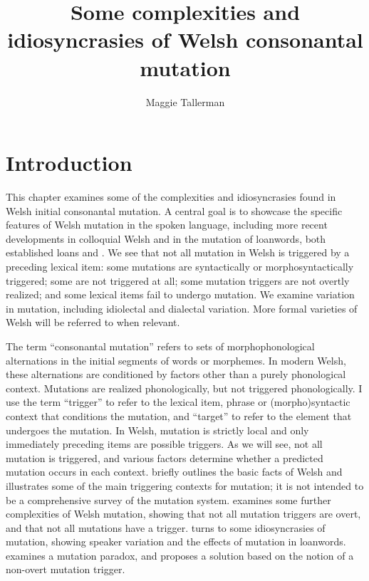 \documentclass[output=paper,colorlinks,citecolor=brown]{langscibook}
\author{Maggie Tallerman\orcid{}\affiliation{Newcastle University}}
\title{Some complexities and idiosyncrasies of Welsh consonantal mutation}
\begin{document}
\maketitle




\section{Introduction}\label{sec:tallerman:1}

This chapter examines some of the complexities and idiosyncrasies found in Welsh initial consonantal mutation. A central goal is to showcase the specific features of Welsh mutation in the spoken language, including more recent developments in colloquial Welsh and in the mutation of loanwords, both established loans and . We see that not all mutation in Welsh is triggered by a preceding lexical item: some mutations are syntactically or morphosyntactically triggered; some are not triggered at all; some mutation triggers are not overtly realized; and some lexical items fail to undergo mutation. We examine variation in mutation, including idiolectal and dialectal variation. More formal varieties of Welsh will be referred to when relevant.

The term “consonantal mutation” refers to sets of morphophonological alternations in the initial segments of words or morphemes. In modern Welsh, these alternations are conditioned by factors other than a purely phonological context.  Mutations are realized phonologically, but not triggered phonologically. I use the term “trigger” to refer to the lexical item, phrase or (morpho)syntactic context that conditions the mutation, and “target” to refer to the element that undergoes the mutation. In Welsh, mutation is strictly local and only immediately preceding items are possible triggers. As we will see, not all mutation is triggered, and various factors determine whether a predicted mutation occurs in each context.  briefly outlines the basic facts of Welsh and illustrates some of the main triggering contexts for mutation; it is not intended to be a comprehensive survey of the mutation system.  examines some further complexities of Welsh mutation, showing that not all mutation triggers are overt, and that not all mutations have a trigger.  turns to some idiosyncrasies of mutation, showing speaker variation and the effects of mutation in loanwords.  examines a mutation paradox, and proposes a solution based on the notion of a non-overt mutation trigger. 
\end{document}
